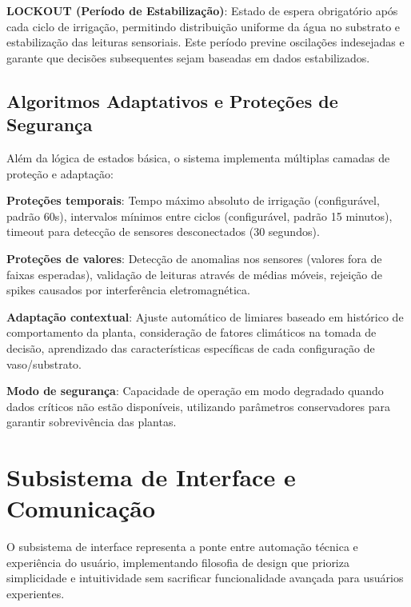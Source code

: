 \textbf{LOCKOUT (Período de Estabilização)}: Estado de espera obrigatório após cada ciclo de irrigação, permitindo distribuição uniforme da água no substrato e estabilização das leituras sensoriais. Este período previne oscilações indesejadas e garante que decisões subsequentes sejam baseadas em dados estabilizados.


\subsection{Algoritmos Adaptativos e Proteções de Segurança}

Além da lógica de estados básica, o sistema implementa múltiplas camadas de proteção e adaptação:

\textbf{Proteções temporais}: Tempo máximo absoluto de irrigação (configurável, padrão 60s), intervalos mínimos entre ciclos (configurável, padrão 15 minutos), timeout para detecção de sensores desconectados (30 segundos).

\textbf{Proteções de valores}: Detecção de anomalias nos sensores (valores fora de faixas esperadas), validação de leituras através de médias móveis, rejeição de spikes causados por interferência eletromagnética.

\textbf{Adaptação contextual}: Ajuste automático de limiares baseado em histórico de comportamento da planta, consideração de fatores climáticos na tomada de decisão, aprendizado das características específicas de cada configuração de vaso/substrato.

\textbf{Modo de segurança}: Capacidade de operação em modo degradado quando dados críticos não estão disponíveis, utilizando parâmetros conservadores para garantir sobrevivência das plantas.

\section{Subsistema de Interface e Comunicação}

O subsistema de interface representa a ponte entre automação técnica e experiência do usuário, implementando filosofia de design que prioriza simplicidade e intuitividade sem sacrificar funcionalidade avançada para usuários experientes.

